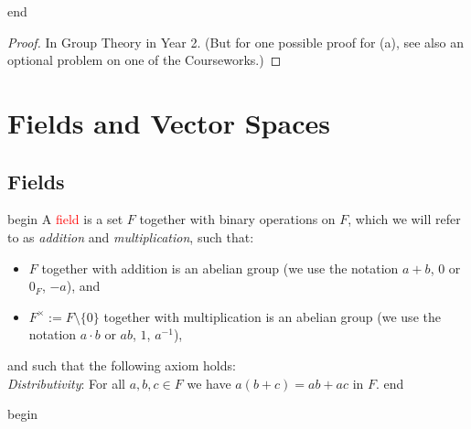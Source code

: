 \documentclass[
  12pt,
  a4paper,
  twoside]{article}
\providecommand{\tightlist}{%
  \setlength{\itemsep}{0pt}\setlength{\parskip}{0pt}}
\theoremstyle{plain}
\theoremstyle{definition}
\begin{document}
\csname end

\begin{proof}
\iffalse{} {Proof. } \fi{}In Group Theory in Year 2. (But for one possible proof for (a), see also an optional problem on one of the Courseworks.)
\end{proof}

\newpage

\hypertarget{vss}{%
\section{Fields and Vector Spaces}\label{vss}}

\hypertarget{ss-fields}{%
\subsection{Fields}\label{ss-fields}}

\csname begin\label{cnj:defn-field}
A \textcolor{red}{field} is a set \(F\) together with binary operations on \(F\), which we will refer to as \emph{addition} and \emph{multiplication}, such that:

\begin{itemize}
\tightlist
\item
  \(F\) together with addition is an abelian group (we use the notation \(a+b\), \(0\) or \(0_F\), \(-a\)), and
\item
  \(F^{\times} := F \setminus \{0\}\) together with multiplication is an abelian group (we use the notation \(a\cdot b\) or \(ab\), \(1\), \(a^{-1}\)),
\end{itemize}

and such that the following axiom holds:\\
\emph{Distributivity}: For all \(a,b,c \in F\) we have \(a(b+c) = ab + ac\) in \(F\).
\csname end

\csname begin\label{cnj:expl-fields}
\end{document}
